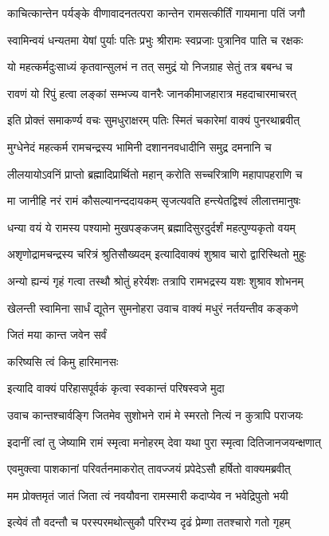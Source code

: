 \twolineshloka
{काचित्कान्तेन पर्यङ्के वीणावादनतत्परा}
{कान्तेन रामसत्कीर्तिं गायमाना पतिं जगौ}%

\twolineshloka
{स्वामिन्वयं धन्यतमा येषां पुर्याः पतिः प्रभुः}
{श्रीरामः स्वप्रजाः पुत्रानिव पाति च रक्षकः}%

\twolineshloka
{यो महत्कर्मदुःसाध्यं कृतवान्सुलभं न तत्}
{समुद्रं यो निजग्राह सेतुं तत्र बबन्ध च}%

\twolineshloka
{रावणं यो रिपुं हत्वा लङ्कां सम्भज्य वानरैः}
{जानकीमाजहारात्र महदाचारमाचरत्}%

\twolineshloka
{इति प्रोक्तं समाकर्ण्य वचः सुमधुराक्षरम्}
{पतिः स्मितं चकारेमां वाक्यं पुनरथाब्रवीत्}%

\twolineshloka
{मुग्धेनेदं महत्कर्म रामचन्द्रस्य भामिनी}
{दशाननवधादीनि समुद्र दमनानि च}%

\twolineshloka
{लीलयायोऽवनिं प्राप्तो ब्रह्मादिप्रार्थितो महान्}
{करोति सच्चरित्राणि महापापहराणि च}%

\twolineshloka
{मा जानीहि नरं रामं कौसल्यानन्ददायकम्}
{सृजत्यवति हन्त्येतद्विश्वं लीलात्तमानुषः}%

\twolineshloka
{धन्या वयं ये रामस्य पश्यामो मुखपङ्कजम्}
{ब्रह्मादिसुरदुर्दर्शं महत्पुण्यकृतो वयम्}%

\twolineshloka
{अशृणोद्रामचन्द्रस्य चरित्रं श्रुतिसौख्यदम्}
{इत्यादिवाक्यं शुश्राव चारो द्वारिस्थितो मुहुः}%

\twolineshloka
{अन्यो ह्यन्यं गृहं गत्वा तस्थौ श्रोतुं हरेर्यशः}
{तत्रापि रामभद्रस्य यशः शुश्राव शोभनम्}%

\twolineshloka
{खेलन्ती स्वामिना सार्धं द्यूतेन सुमनोहरा}
{उवाच वाक्यं मधुरं नर्तयन्तीव कङ्कणे}%

जितं मया कान्त जवेन सर्वं

करिष्यसि त्वं किमु हारिमानसः

\twolineshloka
{इत्यादि वाक्यं परिहासपूर्वकं}
{कृत्वा स्वकान्तं परिषस्वजे मुदा}%

\twolineshloka
{उवाच कान्तश्चार्वङ्गि जितमेव सुशोभने}
{रामं मे स्मरतो नित्यं न कुत्रापि पराजयः}%

\twolineshloka
{इदानीं त्वां तु जेष्यामि रामं स्मृत्वा मनोहरम्}
{देवा यथा पुरा स्मृत्वा दितिजानजयन्क्षणात्}%

\twolineshloka
{एवमुक्त्वा पाशकानां परिवर्तनमाकरोत्}
{तावज्जयं प्रपेदेऽसौ हर्षितो वाक्यमब्रवीत्}%

\twolineshloka
{मम प्रोक्तमृतं जातं जिता त्वं नवयौवना}
{रामस्मारी कदाप्येव न भवेद्रिपुतो भयी}%

\twolineshloka
{इत्येवं तौ वदन्तौ च परस्परमथोत्सुकौ}
{परिरभ्य दृढं प्रेम्णा ततश्चारो गतो गृहम्}%

